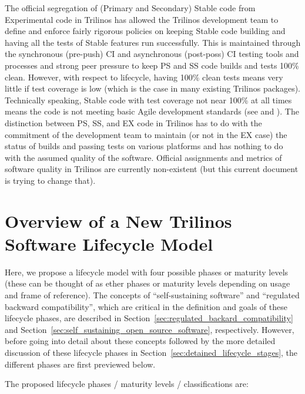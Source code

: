 \documentclass[11pt]{SANDreport}
\begin{document}
The official segregation of (Primary and Secondary) Stable code from
Experimental code in Trilinos has allowed the Trilinos development
team to define and enforce fairly rigorous policies on keeping Stable
code building and having all the tests of Stable features run
successfully.  This is maintained through the synchronous (pre-push)
CI and asynchronous (post-poss) CI testing tools and processes and
strong peer pressure to keep PS and SS code builds and tests 100\%
clean.  However, with respect to lifecycle, having 100\% clean tests
means very little if test coverage is low (which is the case in many
existing Trilinos packages).  Technically speaking, Stable code with
test coverage not near 100\% at all times means the code is not
meeting basic Agile development standards (see {}\cite{XP2} and
{}\cite{CodeComplete2nd04}).  The distinction between PS, SS, and EX
code in Trilinos has to do with the commitment of the development team
to maintain (or not in the EX case) the status of builds and passing
tests on various platforms and has nothing to do with the assumed
quality of the software.  Official assignments and metrics of software
quality in Trilinos are currently non-existent (but this current
document is trying to change that).


%
{}\section{Overview of a New Trilinos Software Lifecycle Model}
\label{sec:life_cycle_overview}
%

Here, we propose a lifecycle model with four possible phases or
maturity levels (these can be thought of as ether phases or maturity
levels depending on usage and frame of reference).  The concepts of
``self-sustaining software'' and ``regulated backward compatibility'',
which are critical in the definition and goals of these lifecycle
phases, are described in
Section~\ref{sec:regulated_backard_compatibility} and
Section~\ref{sec:self_sustaining_open_source_software}, respectively.
However, before going into detail about these concepts followed by the
more detailed discussion of these lifecycle phases in
Section~\ref{sec:detained_lifecycle_stages}, the different phases are
first previewed below.

The proposed lifecycle phases / maturity levels / classifications are:
\end{document}
